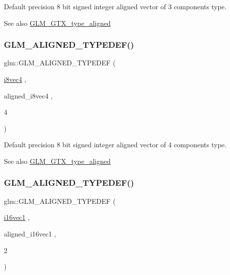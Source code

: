 Default precision 8 bit signed integer aligned vector of 3 components type. \begin{DoxySeeAlso}{See also}
\mbox{\hyperlink{group__gtx__type__aligned}{G\+L\+M\+\_\+\+G\+T\+X\+\_\+type\+\_\+aligned}} 
\end{DoxySeeAlso}
\mbox{\label{group__gtx__type__aligned_ga1fe6fc032a978f1c845fac9aa0668714}} 
\subsubsection{\texorpdfstring{GLM\_ALIGNED\_TYPEDEF()}{GLM\_ALIGNED\_TYPEDEF()}\hspace{0.1cm}{\footnotesize\ttfamily [56/209]}}
{\footnotesize\ttfamily glm\+::\+G\+L\+M\+\_\+\+A\+L\+I\+G\+N\+E\+D\+\_\+\+T\+Y\+P\+E\+D\+EF (\begin{DoxyParamCaption}\item[{\mbox{\hyperlink{group__gtc__type__precision_gafbf10a778016eba57d44beb585f2dc49}{i8vec4}}}]{,  }\item[{aligned\+\_\+i8vec4}]{,  }\item[{4}]{ }\end{DoxyParamCaption})}

Default precision 8 bit signed integer aligned vector of 4 components type. \begin{DoxySeeAlso}{See also}
\mbox{\hyperlink{group__gtx__type__aligned}{G\+L\+M\+\_\+\+G\+T\+X\+\_\+type\+\_\+aligned}} 
\end{DoxySeeAlso}
\mbox{\label{group__gtx__type__aligned_gaa4161e7a496dc96972254143fe873e55}} 
\subsubsection{\texorpdfstring{GLM\_ALIGNED\_TYPEDEF()}{GLM\_ALIGNED\_TYPEDEF()}\hspace{0.1cm}{\footnotesize\ttfamily [57/209]}}
{\footnotesize\ttfamily glm\+::\+G\+L\+M\+\_\+\+A\+L\+I\+G\+N\+E\+D\+\_\+\+T\+Y\+P\+E\+D\+EF (\begin{DoxyParamCaption}\item[{\mbox{\hyperlink{group__gtc__type__precision_gacec84a02174e44363dd105769fb22473}{i16vec1}}}]{,  }\item[{aligned\+\_\+i16vec1}]{,  }\item[{2}]{ }\end{DoxyParamCaption})}


